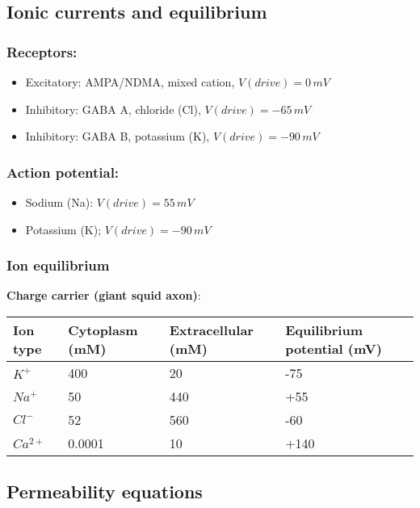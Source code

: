 \documentclass[main]{subfiles}
\begin{document}
\subsection{Ionic currents and equilibrium}
\subsubsection{Receptors:}
\begin{itemize}[noitemsep,nolistsep]
	\item Excitatory: AMPA/NDMA, mixed cation, $V(drive) =0\,mV$
	\item Inhibitory: GABA A, chloride (Cl), $V(drive) =-65\,mV$
	\item Inhibitory: GABA B, potassium (K), $V(drive) =-90\,mV$
\end{itemize}
\subsubsection{Action potential:}
\begin{itemize}[noitemsep,nolistsep]
	\item Sodium (Na): $V(drive) = 55\,mV$
	\item Potassium (K); $V(drive) = -90\,mV$
\end{itemize}

\subsubsection{Ion equilibrium}
\textbf{Charge carrier (giant squid axon)}:\\
\begin{tabular}{|l|l|l|l|}
	\hline
	Ion type & Cytoplasm (mM) & Extracellular (mM) & Equilibrium potential (mV)\\\hline
	$K^+$ & 400 & 20 & -75 \\\hline
	$Na^+$ & 50 & 440 & +55\\\hline
	$Cl^-$ & 52 & 560 & -60\\\hline
	$Ca^{2+}$ & 0.0001 & 10 & +140\\\hline
\end{tabular}
\begin{figure}[H]
	\centering
\end{figure}

\subsection{Permeability equations}
\end{document}
